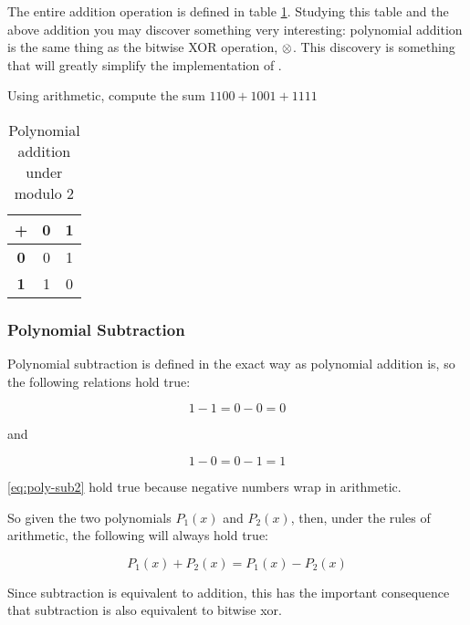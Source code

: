 The entire addition operation is defined in table
\ref{tab:poly-add}. Studying this table and the above addition you may
discover something very interesting: polynomial addition is the same
thing as the bitwise XOR operation, $\mathrel{\otimes}$. This discovery is
something that will greatly simplify the implementation of \crc.

\begin{Exercise}[label={poly-add}]
  Using \crc arithmetic, compute the sum  $1100 + 1001 + 1111$
\end{Exercise}

\begin{table}
  \centering
  \begin{tabular}{|c|c|c|}
    \hline
    \textbf{+} & \textbf{0} & \textbf{1} \\ \hline
    \textbf{0} & 0 & 1 \\ \hline
    \textbf{1} & 1 & 0 \\ \hline
  \end{tabular}
  \caption{Polynomial addition under modulo 2}
  \label{tab:poly-add}
\end{table}

\subsubsection{Polynomial Subtraction}

Polynomial subtraction is defined in the exact way as polynomial
addition is, so the following relations hold true:

\begin{equation}
  \label{eq:poly-sub1}
  1 - 1 = 0 - 0 = 0
\end{equation}

and

\begin{equation}
  \label{eq:poly-sub2}
  1 - 0 = 0 - 1 = 1
\end{equation}

\ref{eq:poly-sub2} hold true because negative numbers wrap in \crc
arithmetic.

So given the two polynomials $P_1(x)$ and $P_2(x)$, then, under the
rules of \crc arithmetic, the following will always hold true:

\begin{equation*}
  P_1(x) + P_2(x) = P_1(x) - P_2(x)
\end{equation*}


Since \crc subtraction is equivalent to \crc addition, this has the
important consequence that \crc subtraction is also equivalent to
bitwise xor.

